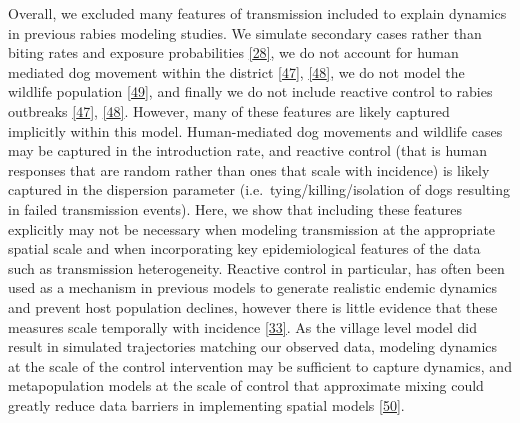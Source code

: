 \documentclass[
  oneside]{book}
\begin{document}
Overall, we excluded many features of transmission included to explain dynamics in previous rabies modeling studies. We simulate secondary cases rather than biting rates and exposure probabilities \protect\hyperlink{ref-Mancyinprep}{{[}28{]}}, we do not account for human mediated dog movement within the district \protect\hyperlink{ref-ferguson2015}{{[}47{]}}, \protect\hyperlink{ref-townsend2013}{{[}48{]}}, we do not model the wildlife population \protect\hyperlink{ref-fitzpatrick2012}{{[}49{]}}, and finally we do not include reactive control to rabies outbreaks \protect\hyperlink{ref-ferguson2015}{{[}47{]}}, \protect\hyperlink{ref-townsend2013}{{[}48{]}}. However, many of these features are likely captured implicitly within this model. Human-mediated dog movements and wildlife cases may be captured in the introduction rate, and reactive control (that is human responses that are random rather than ones that scale with incidence) is likely captured in the dispersion parameter (i.e.~tying/killing/isolation of dogs resulting in failed transmission events). Here, we show that including these features explicitly may not be necessary when modeling transmission at the appropriate spatial scale and when incorporating key epidemiological features of the data such as transmission heterogeneity. Reactive control in particular, has often been used as a mechanism in previous models to generate realistic endemic dynamics and prevent host population declines, however there is little evidence that these measures scale temporally with incidence \protect\hyperlink{ref-Hampson2009}{{[}33{]}}. As the village level model did result in simulated trajectories matching our observed data, modeling dynamics at the scale of the control intervention may be sufficient to capture dynamics, and metapopulation models at the scale of control that approximate mixing could greatly reduce data barriers in implementing spatial models \protect\hyperlink{ref-pascual2011}{{[}50{]}}.
\end{document}
